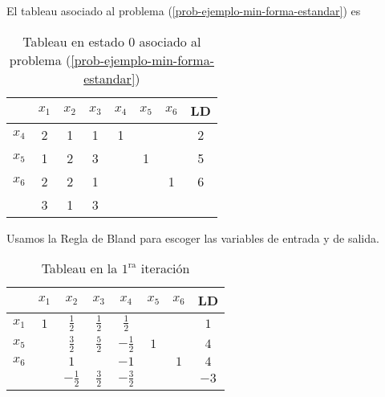 \documentclass[titlepage]{article}
\begin{document}
El tableau asociado al problema (\ref{prob-ejemplo-min-forma-estandar}) es
\begin{table}[ht]
    \centering
    \begin{tabular}{|c|c|c|c|c|c|c|c|}
        \hline
                & $x_1$ & $x_2$ & $x_3$ & $x_4$ & $x_5$ & $x_6$ & LD \\ \hline
        $x_4$   & 2     & 1     & 1     & 1     &       &       & 2  \\ \hline
        $x_5$   & 1     & 2     & 3     &       & 1     &       & 5  \\ \hline
        $x_6$   & 2     & 2     & 1     &       &       & 1     & 6  \\ \hline
                & 3     & 1     & 3     &       &       &       &    \\ \hline
    \end{tabular}
    \caption{Tableau en estado 0 asociado al problema (\ref{prob-ejemplo-min-forma-estandar})}
    \label{tab:tablaeau-1}
\end{table}

Usamos la Regla de Bland para escoger las variables de entrada y de salida.

\begin{table}[ht]
    \centering
    \begin{tabular}{|c|c|c|c|c|c|c|c|}
        \hline
                & $x_1$ & $x_2$             & $x_3$                                     & $x_4$               & $x_5$ & $x_6$ & LD    \\ \hline
        $x_1$   & $1$   & $\frac{1}{2}$     & $\frac{1}{2}$                             & $\frac{1}{2}$       &       &       & $1$   \\ \hline
        $x_5$   &       & $\frac{3}{2}$     & $\frac{5}{2}$ \cellcolor[HTML]{C0C0C0}    & $-\frac{1}{2}$      & $1$   &       & $4$   \\ \hline
        $x_6$   &       & $1$               &                                           & $-1$                &       & $1$   & $4$   \\ \hline
                &       & $-\frac{1}{2}$    & $\frac{3}{2}$                             & $-\frac{3}{2}$      &       &       & $-3$  \\ \hline
    \end{tabular}
    \caption{Tableau en la $1^{\text{ra}}$ iteración}
\end{table}
\end{document}
